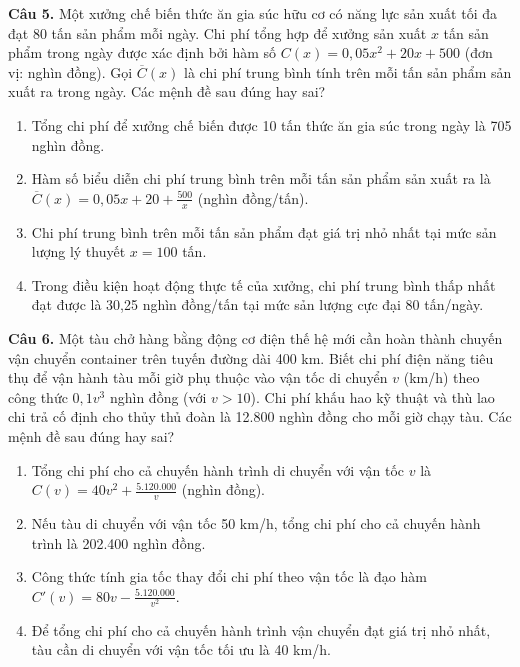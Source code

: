 \documentclass[12pt]{article}
\begin{document}
	\vspace{0.6cm}
	\noindent \textbf{Câu 5.} Một xưởng chế biến thức ăn gia súc hữu cơ có năng lực sản xuất tối đa đạt 80 tấn sản phẩm mỗi ngày. Chi phí tổng hợp để xưởng sản xuất $x$ tấn sản phẩm trong ngày được xác định bởi hàm số $C(x) = 0,05x^2 + 20x + 500$ (đơn vị: nghìn đồng). Gọi $\overline{C}(x)$ là chi phí trung bình tính trên mỗi tấn sản phẩm sản xuất ra trong ngày. Các mệnh đề sau đúng hay sai?
	\begin{enumerate}[label=\textbf{\alph*)}]
		\item Tổng chi phí để xưởng chế biến được 10 tấn thức ăn gia súc trong ngày là 705 nghìn đồng. \hfill  
		\item Hàm số biểu diễn chi phí trung bình trên mỗi tấn sản phẩm sản xuất ra là $\overline{C}(x) = 0,05x + 20 + \frac{500}{x}$ (nghìn đồng/tấn). \hfill  
		\item Chi phí trung bình trên mỗi tấn sản phẩm đạt giá trị nhỏ nhất tại mức sản lượng lý thuyết $x = 100$ tấn. \hfill  
		\item Trong điều kiện hoạt động thực tế của xưởng, chi phí trung bình thấp nhất đạt được là 30,25 nghìn đồng/tấn tại mức sản lượng cực đại 80 tấn/ngày. \hfill  
	\end{enumerate}
	
	\vspace{0.6cm}
	\noindent \textbf{Câu 6.} Một tàu chở hàng bằng động cơ điện thế hệ mới cần hoàn thành chuyến vận chuyển container trên tuyến đường dài 400 km. Biết chi phí điện năng tiêu thụ để vận hành tàu mỗi giờ phụ thuộc vào vận tốc di chuyển $v$ (km/h) theo công thức $0,1v^3$ nghìn đồng (với $v > 10$). Chi phí khấu hao kỹ thuật và thù lao chi trả cố định cho thủy thủ đoàn là 12.800 nghìn đồng cho mỗi giờ chạy tàu. Các mệnh đề sau đúng hay sai?
	\begin{enumerate}[label=\textbf{\alph*)}]
		\item Tổng chi phí cho cả chuyến hành trình di chuyển với vận tốc $v$ là $C(v) = 40v^2 + \frac{5.120.000}{v}$ (nghìn đồng). \hfill  
		\item Nếu tàu di chuyển với vận tốc 50 km/h, tổng chi phí cho cả chuyến hành trình là 202.400 nghìn đồng. \hfill  
		\item Công thức tính gia tốc thay đổi chi phí theo vận tốc là đạo hàm $C'(v) = 80v - \frac{5.120.000}{v^2}$. \hfill  
		\item Để tổng chi phí cho cả chuyến hành trình vận chuyển đạt giá trị nhỏ nhất, tàu cần di chuyển với vận tốc tối ưu là 40 km/h. \hfill  
	\end{enumerate}
	
\end{document}
